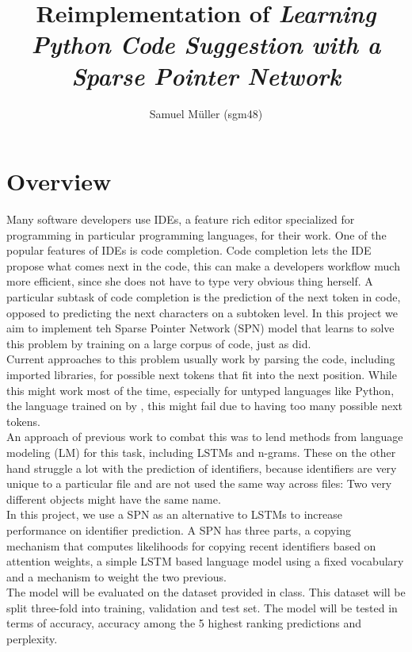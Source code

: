 \documentclass[11pt]{article}
\begin{document}
\title{Reimplementation of \textit{Learning Python Code Suggestion with a Sparse Pointer Network}}
\author{Samuel Müller (sgm48)}
\maketitle
\section{Overview}
Many software developers use IDEs, a feature rich editor specialized for programming in particular programming languages, for their work. One of the popular features of IDEs is code completion. Code completion lets the IDE propose what comes next in the code, this can make a developers workflow much more efficient, since she does not have to type very obvious thing herself.
A particular subtask of code completion is the prediction of the next token in code, opposed to predicting the next characters on a subtoken level.
In this project we aim to implement teh Sparse Pointer Network (SPN) \citep{bhoopchand2016learning} model that learns to solve this problem by training on a large corpus of code, just as \cite{bhoopchand2016learning} did.
\\
Current approaches to this problem usually work by parsing the code, including imported libraries, for possible next tokens that fit into the next position. While this might work most of the time, especially for untyped languages like Python, the language trained on by \cite{bhoopchand2016learning}, this might fail due to having too many possible next tokens.\\
An approach of previous work to combat this was to lend methods from language modeling (LM) for this task, including LSTMs and n-grams. These on the other hand struggle a lot with the prediction of identifiers, because identifiers are very unique to a particular file and are not used the same way across files: Two very different objects might have the same name.\\
In this project, we use a SPN as an alternative to LSTMs to increase performance on identifier prediction. A SPN has three parts, a copying mechanism that computes likelihoods for copying recent identifiers based on attention weights, a simple LSTM based language model using a fixed vocabulary and a mechanism to weight the two previous.\\
The model will be evaluated on the dataset provided in class. This dataset will be split three-fold into training, validation and test set. The model will be tested in terms of accuracy, accuracy among the 5 highest ranking predictions and perplexity.
\end{document}
